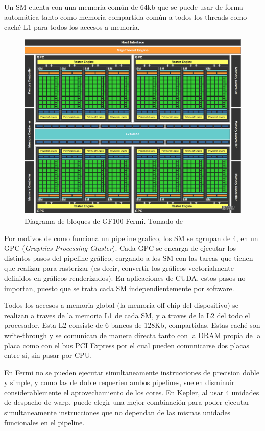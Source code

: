 Un SM cuenta con una memoria com\'un de 64kb que se puede usar de forma autom\'atica tanto como memoria
compartida com\'un a todos los threads como cach\'e L1 para todos los accesos a memoria.

\begin{figure}[htbp]
    \centering
    \includegraphics[width=\textwidth]{images/fermi-gpu-block.png}
    \caption{Diagrama de bloques de GF100 Fermi. Tomado de~\cite{NvidiaFermi}}
    \label{fermi_gpu_block}
\end{figure}


Por motivos de como funciona un pipeline grafico, los SM se agrupan de 4, en un GPC (\textit{Graphics
Processing Cluster}). Cada GPC se encarga de ejecutar los distintos pasos del pipeline gr\'afico,
cargando a los SM con las tareas que tienen que realizar para rasterizar (es decir, convertir los
gr\'aficos vectorialmente definidos en gr\'aficos renderizados). En aplicaciones de CUDA, estos pasos
no importan, puesto que se trata cada SM independientemente por software.

Todos los accesos a memoria global (la memoria off-chip del dispositivo) se realizan a traves de la memoria
L1 de cada SM, y a traves de la L2 del todo el procesador. Esta L2 consiste de 6 bancos de 128Kb, compartidas.
Estas cach\'e son write-through y se comunican de manera directa tanto con la DRAM propia de la placa como
con el bus PCI Express por el cual pueden comunicarse dos placas entre si, sin pasar por CPU.

En Fermi no se pueden ejecutar simultaneamente instrucciones de precision doble y simple, y como
las de doble requerien ambos pipelines, suelen disminuir considerablemente el aprovechamiento
de los cores. En Kepler, al usar 4 unidades de despacho de warp, puede elegir una mejor
combinaci\'on para poder ejecutar simultaneamente instrucciones que no dependan de las mismas
unidades funcionales en el pipeline. ~\cite{NvidiaKepler}

